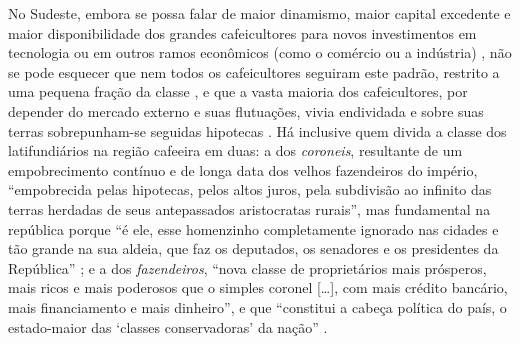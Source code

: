 No Sudeste, embora se possa falar de maior dinamismo, maior capital excedente e maior disponibilidade dos grandes cafeicultores para novos investimentos em tecnologia ou em outros ramos econômicos (como o comércio ou a indústria) \cite[p.~153-154]{CARONE1970inst}, não se pode esquecer que nem todos os cafeicultores seguiram este padrão, restrito a uma pequena fração da classe \cite[p.~32-38]{gorender_burguesia_1990}, e que a vasta maioria dos cafeicultores, por depender do mercado externo e suas flutuações, vivia endividada e sobre suas terras sobrepunham-se seguidas hipotecas \cite[p.~154]{CARONE1970inst}. Há inclusive quem divida a classe dos latifundiários na região cafeeira em duas: a dos \textit{coroneis}, resultante de um empobrecimento contínuo e de longa data dos velhos fazendeiros do império, ``empobrecida pelas hipotecas, pelos altos juros, pela subdivisão ao infinito das terras herdadas de seus antepassados aristocratas rurais'', mas fundamental na república porque ``é ele, esse homenzinho completamente ignorado nas cidades e tão grande na sua aldeia, que faz os deputados, os senadores e os presidentes da República'' \cite[pp.~146-148]{basbaum_histsinc_1967} ; e a dos \textit{fazendeiros}, ``nova classe de proprietários mais prósperos, mais ricos e mais poderosos que o simples coronel [\dots], com mais crédito bancário, mais financiamento e mais dinheiro'', e que ``constitui a cabeça política do país, o estado-maior das `classes conservadoras' da nação'' \cite[p.~149]{basbaum_histsinc_1967}.

